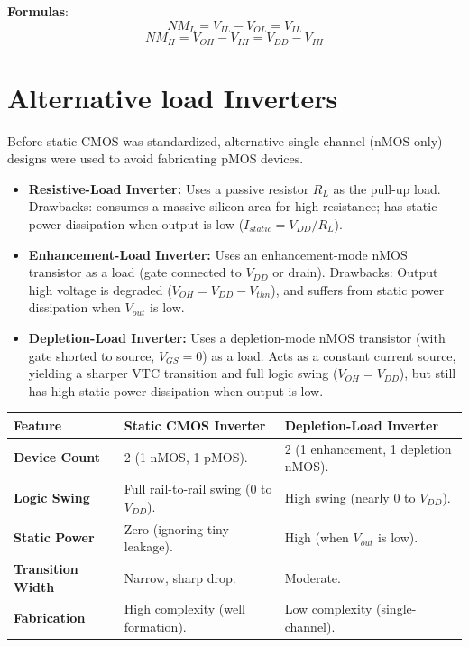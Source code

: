\documentclass[12pt,a4paper]{article}
\renewcommand{\arraystretch}{1.45}
\begin{document}
\textbf{Formulas}:
\begin{equation}
  NM_L = V_{IL} - V_{OL} = V_{IL}
\end{equation}
\begin{equation}
  NM_H = V_{OH} - V_{IH} = V_{DD} - V_{IH}
\end{equation}

\section{Alternative load Inverters}

Before static CMOS was standardized, alternative single-channel (nMOS-only) designs were used to avoid fabricating pMOS devices.

\begin{itemize}[leftmargin=*, itemsep=3.5pt]
  \item \textbf{Resistive-Load Inverter:} Uses a passive resistor $R_L$ as the pull-up load. Drawbacks: consumes a massive silicon area for high resistance; has static power dissipation when output is low ($I_{static} = V_{DD}/R_L$).
  \item \textbf{Enhancement-Load Inverter:} Uses an enhancement-mode nMOS transistor as a load (gate connected to $V_{DD}$ or drain). Drawbacks: Output high voltage is degraded ($V_{OH} = V_{DD} - V_{thn}$), and suffers from static power dissipation when $V_{out}$ is low.
  \item \textbf{Depletion-Load Inverter:} Uses a depletion-mode nMOS transistor (with gate shorted to source, $V_{GS}=0$) as a load. Acts as a constant current source, yielding a sharper VTC transition and full logic swing ($V_{OH} = V_{DD}$), but still has high static power dissipation when output is low.
\end{itemize}

\begin{tcolorbox}[tikzbox, title={CMOS vs Depletion-Load Inverter Comparison}]
\renewcommand{\arraystretch}{1.4}
\par\noindent
\begin{tabularx}{\linewidth}{|B{3.2cm}|Y|Y|}
\hline
\textbf{Feature} & \textbf{\color{myred}Static CMOS Inverter} & \textbf{\color{myteal}Depletion-Load Inverter} \\
\hline
\textbf{Device Count} & 2 (1 nMOS, 1 pMOS). & 2 (1 enhancement, 1 depletion nMOS). \\
\hline
\textbf{Logic Swing} & Full rail-to-rail swing ($0$ to $V_{DD}$). & High swing (nearly $0$ to $V_{DD}$). \\
\hline
\textbf{Static Power} & Zero (ignoring tiny leakage). & High (when $V_{out}$ is low). \\
\hline
\textbf{Transition Width} & Narrow, sharp drop. & Moderate. \\
\hline
\textbf{Fabrication} & High complexity (well formation). & Low complexity (single-channel). \\
\hline
\end{tabularx}
\end{tcolorbox}
\end{document}
